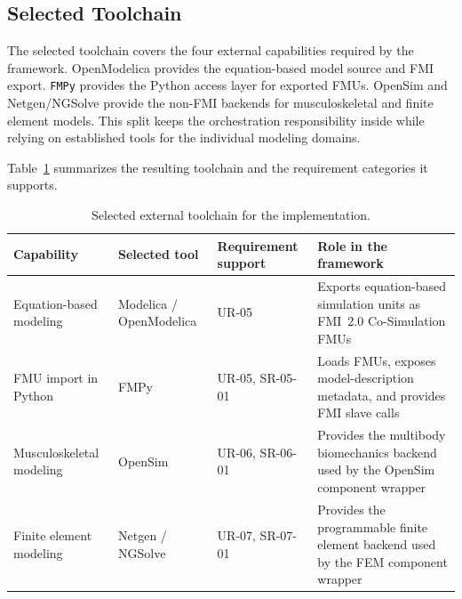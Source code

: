 \subsection{Selected Toolchain}
\label{sec:tool_selection_summary}

The selected toolchain covers the four external capabilities required by the framework.
OpenModelica provides the equation-based model source and \ac{FMI} export.
\texttt{FMPy} provides the Python access layer for exported \acp{FMU}.
OpenSim and Netgen/NGSolve provide the non-\ac{FMI} backends for musculoskeletal and finite element models.
This split keeps the orchestration responsibility inside \syssimx{} while relying on established tools for the individual modeling domains.

Table~\ref{tab:selected_toolchain} summarizes the resulting toolchain and the requirement categories it supports.

\begin{table}[htbp]
  \centering
  \small
  \caption[Selected external toolchain]{Selected external toolchain for the \syssimx{} implementation.}
  \label{tab:selected_toolchain}
  \begin{tabular}{p{3.0cm} p{3.2cm} p{3.5cm} p{4.5cm}}
    \toprule
    \textbf{Capability} & \textbf{Selected tool} & \textbf{Requirement support} & \textbf{Role in the framework} \\
    \midrule
    Equation-based modeling
      & Modelica / OpenModelica
      & UR-05
      & Exports equation-based simulation units as \ac{FMI}~2.0 Co-Simulation \acp{FMU} \\
    \addlinespace
    \ac{FMU} import in Python
      & FMPy
      & UR-05, SR-05-01
      & Loads \acp{FMU}, exposes model-description metadata, and provides \ac{FMI} slave calls \\
    \addlinespace
    Musculoskeletal modeling
      & OpenSim
      & UR-06, SR-06-01
      & Provides the multibody biomechanics backend used by the OpenSim component wrapper \\
    \addlinespace
    Finite element modeling
      & Netgen / NGSolve
      & UR-07, SR-07-01
      & Provides the programmable finite element backend used by the \ac{FEM} component wrapper \\
    \bottomrule
  \end{tabular}
\end{table}
